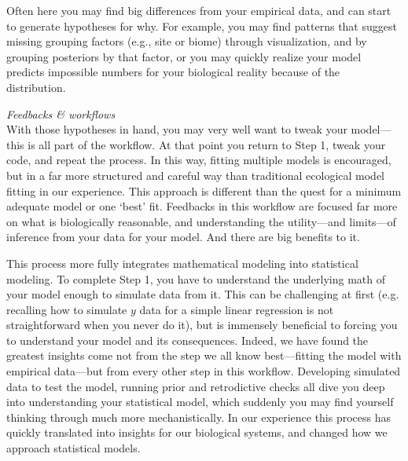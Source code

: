 \documentclass[11pt]{article}
\begin{document}
{%
Often here you may find big differences from your empirical data, and can start to generate hypotheses for why. For example, you may find patterns that suggest missing grouping factors (e.g., site or biome) through visualization, and by grouping posteriors by that factor, or you may quickly realize your model predicts impossible numbers for your biological reality because of the distribution. 

\emph{Feedbacks \& workflows}\\
With those hypotheses in hand, you may very well want to tweak your model---this is all part of the workflow. At that point you return to Step 1, tweak your code, and repeat the process. In this way, fitting multiple models is encouraged, but in a far more structured and careful way than traditional ecological model fitting in our experience. This approach is different than the quest for a minimum adequate model or one `best' fit. Feedbacks in this workflow are focused far more on what is biologically reasonable, and understanding the utility---and limits---of inference from your data for your model.  And there are big benefits to it. %

This process more fully integrates mathematical modeling into statistical modeling. To complete Step 1, you have to understand the underlying math of your model enough to simulate data from it. This can be challenging at first (e.g. recalling how to simulate $y$ data for a simple linear regression is not straightforward when you never do it), but is immensely beneficial to forcing you to understand your model and its consequences. Indeed, we have found the greatest insights come not from the step we all know best---fitting the model with empirical data---but from every other step in this workflow. Developing simulated data to test the model, running prior and retrodictive checks all dive you deep into understanding your statistical model, which suddenly you may find yourself thinking through much more mechanistically. In our experience this process has quickly translated into insights for our biological systems, and changed how we approach statistical models. %

}
\end{document}
